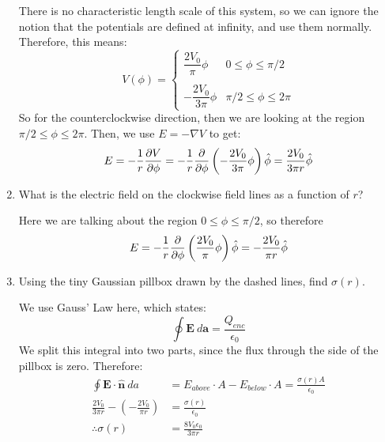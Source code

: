 \documentclass[10pt]{article}
\begin{document}
\begin{enumerate}[label=(\alph*)]
        \begin{solution}
            There is no characteristic length scale of this system, so we can ignore the notion that the potentials are defined at infinity, and use them normally. Therefore, this means: 
            \[ V(\phi) = \begin{cases}
                \dfrac{2V_0}{\pi}\phi & 0 \le \phi \le \pi/2\\
                \\
                -\dfrac{2V_0}{3\pi} \phi & \pi/2 \le \phi \le 2\pi
            \end{cases}\]
            So for the counterclockwise direction, then we are looking at the region $\pi/2 \le \phi \le 2\pi$. Then, we use $E = -\nabla V$ to get: 
            \[ E = - \frac{1}{r} \pdv{V}{\phi} = -\frac{1}{r} \pdv{\phi}\left( -\frac{2V_0}{3\pi}\phi\right)\hat \phi = \frac{2V_0}{3\pi r} \hat \phi\]
        \end{solution}
        \item What is the electric field on the clockwise field lines as a function of $r$?
        
        \begin{solution}
            Here we are talking about the region $0 \le \phi \le \pi/2$, so therefore 
            \[ E = -\frac{1}{r} \pdv{\phi} \left( \frac{2V_0}{\pi} \phi \right) \hat \phi = -\frac{2V_0}{\pi r} \hat \phi\]
        \end{solution}
        \item Using the tiny Gaussian pillbox drawn by the dashed lines, find $\sigma(r)$.
        
        \begin{solution}
            We use Gauss' Law here, which states:
            \[ \oint \mathbf E  \ d\mathbf a = \frac{Q_{enc}}{\epsilon_0}\]
            We split this integral into two parts, since the flux through the side of the pillbox is zero. Therefore: 
            \begin{align*}
                \oint \mathbf E \cdot \mathbf{\hat n}\  da &= E_{above}\cdot A - E_{below}\cdot A = \frac{\sigma(r) A}{\epsilon_0}\\
                \frac{2V_0}{3\pi r} - \left( -\frac{2V_0}{\pi r}\right) &= \frac{\sigma(r)}{\epsilon_0}\\
                \therefore \sigma(r) &= \frac{8V_0\epsilon_0}{3\pi r}
            \end{align*}
        \end{solution}
    \end{enumerate}
\end{document}
